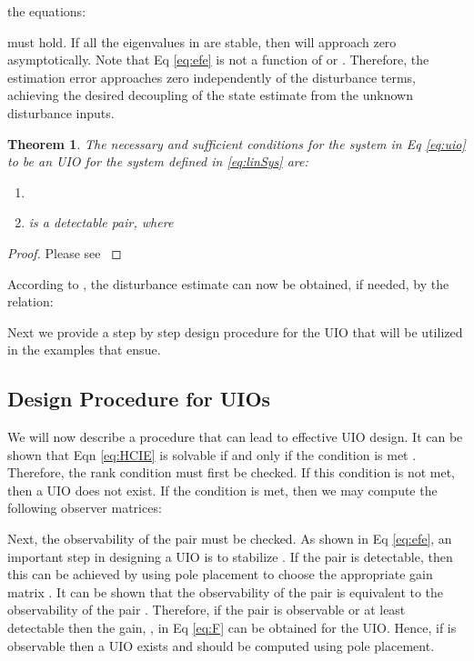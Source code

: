 \documentclass{amsart}
\newtheorem{theorem}{Theorem}[section]
\theoremstyle{definition}
\theoremstyle{remark}
\numberwithin{equation}{section}
\begin{document}
the equations: 


must hold. If all the eigenvalues in  are stable, then  will approach zero asymptotically.  Note that Eq \ref{eq:efe} is not a function of  or .  Therefore, the estimation error approaches zero independently of the disturbance terms, achieving the desired decoupling of the state estimate from the unknown disturbance inputs.  

\begin{theorem}The necessary and sufficient conditions for the system in Eq \ref{eq:uio} to be an UIO for the system defined in \ref{eq:linSys} are: 
\begin{enumerate}
    \item 
    \item  is a detectable pair, where 
\end{enumerate}
\end{theorem}

\begin{proof}
Please see \cite{Chen99}
\end{proof}
According to \cite{Shaf2015}, the disturbance estimate can now be obtained, if needed, by the relation:



Next we provide a step by step design procedure for the UIO that will be utilized in the examples that ensue. 
\subsection{Design Procedure for UIOs} 
\label{sec: UIODesign}
 
We will now describe a procedure that can lead to effective UIO design.  It can be shown that Eqn \ref{eq:HCIE} is solvable if and only if the condition  is met \cite{Chen99}. Therefore, the rank condition   must first be checked. If this condition is not met, then a UIO does not exist.  If the condition is met, then we may compute the following observer matrices: 

\begin{center}

\end{center}
Next, the observability of the pair  must be checked. As shown in Eq \ref{eq:efe}, an important step in designing a UIO is to stabilize .  If the pair  is detectable, then this can be achieved by using pole placement to choose the appropriate gain matrix .  It can be shown that the observability of the pair  is equivalent to the observability of the pair  \cite{Sch12}. Therefore, if the pair  is observable or at least detectable then the gain, , in Eq \ref{eq:F} can be obtained for the UIO. Hence, if  is observable then a UIO exists and  should be computed using pole placement. 
\vspace{3mm}
\end{document}

